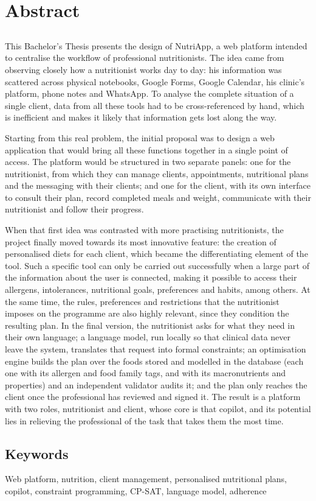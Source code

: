 \chapter*{Abstract}

\section*{\tituloPortadaEngVal}

This Bachelor's Thesis presents the design of NutriApp, a web platform intended to centralise the workflow of professional nutritionists. The idea came from observing closely how a nutritionist works day to day: his information was scattered across physical notebooks, Google Forms, Google Calendar, his clinic's platform, phone notes and WhatsApp. To analyse the complete situation of a single client, data from all these tools had to be cross-referenced by hand, which is inefficient and makes it likely that information gets lost along the way.

Starting from this real problem, the initial proposal was to design a web application that would bring all these functions together in a single point of access. The platform would be structured in two separate panels: one for the nutritionist, from which they can manage clients, appointments, nutritional plans and the messaging with their clients; and one for the client, with its own interface to consult their plan, record completed meals and weight, communicate with their nutritionist and follow their progress.

When that first idea was contrasted with more practising nutritionists, the project finally moved towards its most innovative feature: the creation of personalised diets for each client, which became the differentiating element of the tool. Such a specific tool can only be carried out successfully when a large part of the information about the user is connected, making it possible to access their allergens, intolerances, nutritional goals, preferences and habits, among others. At the same time, the rules, preferences and restrictions that the nutritionist imposes on the programme are also highly relevant, since they condition the resulting plan. In the final version, the nutritionist asks for what they need in their own language; a language model, run locally so that clinical data never leave the system, translates that request into formal constraints; an optimisation engine builds the plan over the foods stored and modelled in the database (each one with its allergen and food family tags, and with its macronutrients and properties) and an independent validator audits it; and the plan only reaches the client once the professional has reviewed and signed it. The result is a platform with two roles, nutritionist and client, whose core is that copilot, and its potential lies in relieving the professional of the task that takes them the most time.

\section*{Keywords}

\noindent Web platform, nutrition, client management, personalised nutritional plans, copilot, constraint programming, CP-SAT, language model, adherence

